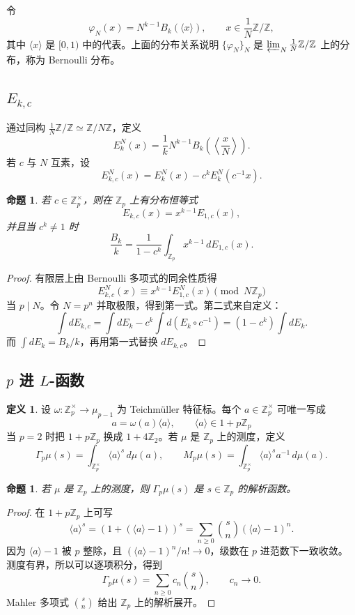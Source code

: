 \documentclass[11pt,a4paper,openany]{ctexbook}
\numberwithin{equation}{chapter}
\newcommand{\Z}{\mathbb{Z}}
\theoremstyle{plain}
\newtheorem{proposition}[theorem]{命题}
\theoremstyle{definition}
\newtheorem{definition}[theorem]{定义}
\theoremstyle{remark}
\begin{document}
令
\[
  \varphi_N(x)=N^{k-1}B_k(\langle x\rangle),\qquad x\in \frac1N\Z/\Z,
\]
其中 $\langle x\rangle$ 是 $[0,1)$ 中的代表。上面的分布关系说明 $\{\varphi_N\}_N$ 是 $\varprojlim_N\frac1N\Z/\Z$ 上的分布，称为 Bernoulli 分布。

\subsection{\texorpdfstring{$E_{k,c}$}{E k c}}

通过同构 $\frac1N\Z/\Z\simeq \Z/N\Z$，定义
\[
  E_k^N(x)=\frac1kN^{k-1}B_k\!\left(\left\langle\frac{x}{N}\right\rangle\right).
\]
若 $c$ 与 $N$ 互素，设
\[
  E_{k,c}^N(x)=E_k^N(x)-c^kE_k^N(c^{-1}x).
\]

\begin{proposition}
若 $c\in\Z_p^\times$，则在 $\Z_p$ 上有分布恒等式
\[
  E_{k,c}(x)=x^{k-1}E_{1,c}(x),
\]
并且当 $c^k\ne1$ 时
\[
  \frac{B_k}{k}=\frac{1}{1-c^k}\int_{\Z_p}x^{k-1}\,dE_{1,c}(x).
\]
\end{proposition}

\begin{proof}
有限层上由 Bernoulli 多项式的同余性质得
\[
  E_{k,c}^N(x)\equiv x^{k-1}E_{1,c}^N(x)\pmod {N\Z_p}
\]
当 $p\mid N$。令 $N=p^n$ 并取极限，得到第一式。第二式来自定义：
\[
  \int dE_{k,c}=\int dE_k-c^k\int d(E_k\circ c^{-1})=(1-c^k)\int dE_k.
\]
而 $\int dE_k=B_k/k$，再用第一式替换 $dE_{k,c}$。
\end{proof}

\subsection{\texorpdfstring{$p$ 进 $L$-函数}{p 进 L-函数}}

\begin{definition}
设 $\omega:\Z_p^\times\to\mu_{p-1}$ 为 Teichmüller 特征标。每个 $a\in\Z_p^\times$ 可唯一写成
\[
  a=\omega(a)\langle a\rangle,\qquad \langle a\rangle\in 1+p\Z_p
\]
当 $p=2$ 时把 $1+p\Z_p$ 换成 $1+4\Z_2$。若 $\mu$ 是 $\Z_p$ 上的测度，定义
\[
  \Gamma_p\mu(s)=\int_{\Z_p^\times}\langle a\rangle^s\,d\mu(a),\qquad
  M_p\mu(s)=\int_{\Z_p^\times}\langle a\rangle^s a^{-1}\,d\mu(a).
\]
\end{definition}

\begin{proposition}
若 $\mu$ 是 $\Z_p$ 上的测度，则 $\Gamma_p\mu(s)$ 是 $s\in\Z_p$ 的解析函数。
\end{proposition}

\begin{proof}
在 $1+p\Z_p$ 上可写
\[
  \langle a\rangle^s=(1+(\langle a\rangle-1))^s
  =\sum_{n\ge0}\binom{s}{n}(\langle a\rangle-1)^n.
\]
因为 $\langle a\rangle-1$ 被 $p$ 整除，且 $(\langle a\rangle-1)^n/n!\to0$，级数在 $p$ 进范数下一致收敛。测度有界，所以可以逐项积分，得到
\[
  \Gamma_p\mu(s)=\sum_{n\ge0}c_n\binom{s}{n},\qquad c_n\to0.
\]
Mahler 多项式 $\binom{s}{n}$ 给出 $\Z_p$ 上的解析展开。
\end{proof}
\end{document}
